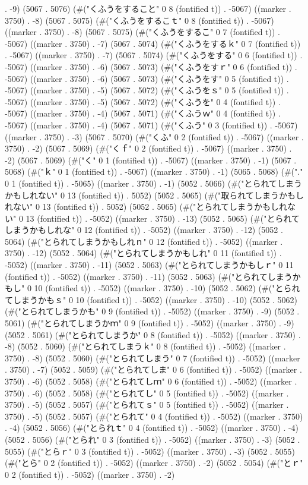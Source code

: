 {{. -9) (5067 . 5076) (#("くふうをすること" 0 8 (fontified t)) . -5067) ((marker . 3750) . -8) (5067 . 5075) (#("くふうをするこｔ" 0 8 (fontified t)) . -5067) ((marker . 3750) . -8) (5067 . 5075) (#("くふうをするこ" 0 7 (fontified t)) . -5067) ((marker . 3750) . -7) (5067 . 5074) (#("くふうをするｋ" 0 7 (fontified t)) . -5067) ((marker . 3750) . -7) (5067 . 5074) (#("くふうをする" 0 6 (fontified t)) . -5067) ((marker . 3750) . -6) (5067 . 5073) (#("くふうをすｒ" 0 6 (fontified t)) . -5067) ((marker . 3750) . -6) (5067 . 5073) (#("くふうをす" 0 5 (fontified t)) . -5067) ((marker . 3750) . -5) (5067 . 5072) (#("くふうをｓ" 0 5 (fontified t)) . -5067) ((marker . 3750) . -5) (5067 . 5072) (#("くふうを" 0 4 (fontified t)) . -5067) ((marker . 3750) . -4) (5067 . 5071) (#("くふうｗ" 0 4 (fontified t)) . -5067) ((marker . 3750) . -4) (5067 . 5071) (#("くふう" 0 3 (fontified t)) . -5067) ((marker . 3750) . -3) (5067 . 5070) (#("くふ" 0 2 (fontified t)) . -5067) ((marker . 3750) . -2) (5067 . 5069) (#("くｆ" 0 2 (fontified t)) . -5067) ((marker . 3750) . -2) (5067 . 5069) (#("く" 0 1 (fontified t)) . -5067) ((marker . 3750) . -1) (5067 . 5068) (#("ｋ" 0 1 (fontified t)) . -5067) ((marker . 3750) . -1) (5065 . 5068) (#("." 0 1 (fontified t)) . -5065) ((marker . 3750) . -1) (5052 . 5066) (#("とられてしまうかもしれない" 0 13 (fontified t)) . 5052) (5052 . 5065) (#("取られてしまうかもしれない" 0 13 (fontified t)) . 5052) (5052 . 5065) (#("とられてしまうかもしれない" 0 13 (fontified t)) . -5052) ((marker . 3750) . -13) (5052 . 5065) (#("とられてしまうかもしれな" 0 12 (fontified t)) . -5052) ((marker . 3750) . -12) (5052 . 5064) (#("とられてしまうかもしれｎ" 0 12 (fontified t)) . -5052) ((marker . 3750) . -12) (5052 . 5064) (#("とられてしまうかもしれ" 0 11 (fontified t)) . -5052) ((marker . 3750) . -11) (5052 . 5063) (#("とられてしまうかもしｒ" 0 11 (fontified t)) . -5052) ((marker . 3750) . -11) (5052 . 5063) (#("とられてしまうかもし" 0 10 (fontified t)) . -5052) ((marker . 3750) . -10) (5052 . 5062) (#("とられてしまうかもｓ" 0 10 (fontified t)) . -5052) ((marker . 3750) . -10) (5052 . 5062) (#("とられてしまうかも" 0 9 (fontified t)) . -5052) ((marker . 3750) . -9) (5052 . 5061) (#("とられてしまうかｍ" 0 9 (fontified t)) . -5052) ((marker . 3750) . -9) (5052 . 5061) (#("とられてしまうか" 0 8 (fontified t)) . -5052) ((marker . 3750) . -8) (5052 . 5060) (#("とられてしまうｋ" 0 8 (fontified t)) . -5052) ((marker . 3750) . -8) (5052 . 5060) (#("とられてしまう" 0 7 (fontified t)) . -5052) ((marker . 3750) . -7) (5052 . 5059) (#("とられてしま" 0 6 (fontified t)) . -5052) ((marker . 3750) . -6) (5052 . 5058) (#("とられてしｍ" 0 6 (fontified t)) . -5052) ((marker . 3750) . -6) (5052 . 5058) (#("とられてし" 0 5 (fontified t)) . -5052) ((marker . 3750) . -5) (5052 . 5057) (#("とられてｓ" 0 5 (fontified t)) . -5052) ((marker . 3750) . -5) (5052 . 5057) (#("とられて" 0 4 (fontified t)) . -5052) ((marker . 3750) . -4) (5052 . 5056) (#("とられｔ" 0 4 (fontified t)) . -5052) ((marker . 3750) . -4) (5052 . 5056) (#("とられ" 0 3 (fontified t)) . -5052) ((marker . 3750) . -3) (5052 . 5055) (#("とらｒ" 0 3 (fontified t)) . -5052) ((marker . 3750) . -3) (5052 . 5055) (#("とら" 0 2 (fontified t)) . -5052) ((marker . 3750) . -2) (5052 . 5054) (#("とｒ" 0 2 (fontified t)) . -5052) ((marker . 3750) . -2) }}
